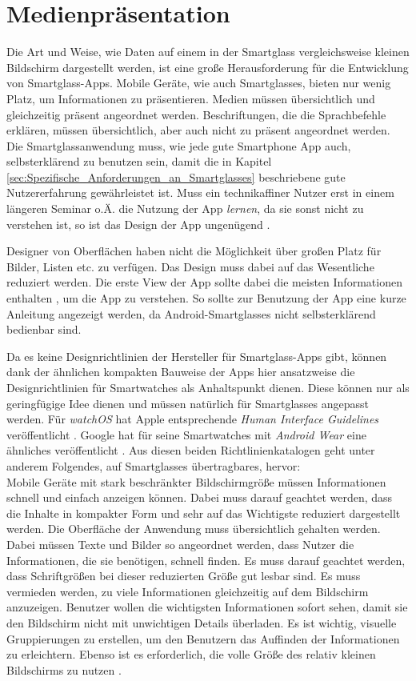 \section{Medienpräsentation}
\label{sec:Medienpraesentation}
Die Art und Weise, wie Daten auf einem in der Smartglass vergleichsweise kleinen Bildschirm dargestellt werden, ist eine große Herausforderung für die Entwicklung von Smartglass-Apps. Mobile Geräte, wie auch Smartglasses, bieten nur wenig Platz, um Informationen zu präsentieren. Medien müssen übersichtlich und gleichzeitig präsent angeordnet werden. Beschriftungen, die die Sprachbefehle erklären, müssen übersichtlich, aber auch nicht zu präsent angeordnet werden. Die Smartglassanwendung muss, wie jede gute Smartphone App auch, selbsterklärend zu benutzen sein, damit die in Kapitel \ref{sec:Spezifische_Anforderungen_an_Smartglasses} beschriebene gute Nutzererfahrung gewährleistet ist. 
Muss ein technikaffiner Nutzer erst in einem längeren Seminar o.Ä. die Nutzung der App \emph{lernen}, da sie sonst nicht zu verstehen ist, so ist das Design der App ungenügend \cite{Hoober2011} \cite[S.~141ff]{Norman2013}.

Designer von Oberflächen haben nicht die Möglichkeit über großen Platz für Bilder, Listen etc. zu verfügen. Das Design muss dabei auf das Wesentliche reduziert werden. Die erste View der App sollte dabei die meisten Informationen enthalten \cite[S.~442]{Tidwell2005}, um die App zu verstehen. So sollte zur Benutzung der App eine kurze Anleitung angezeigt werden, da Android-Smartglasses nicht selbsterklärend bedienbar sind.

Da es keine Designrichtlinien der Hersteller für Smartglass-Apps gibt, können dank der ähnlichen kompakten Bauweise der Apps hier ansatzweise die Designrichtlinien für Smartwatches als Anhaltspunkt dienen. Diese können nur als geringfügige Idee dienen und müssen natürlich für Smartglasses angepasst werden.
Für \emph{watchOS} hat Apple entsprechende \emph{Human Interface Guidelines} veröffentlicht \cite{Apple2018c}. Google hat für seine Smartwatches mit \emph{Android Wear} eine ähnliches veröffentlicht \cite{Google2018}. Aus diesen beiden Richtlinienkatalogen geht unter anderem Folgendes, auf Smartglasses übertragbares, hervor:
\\
Mobile Geräte mit stark beschränkter Bildschirmgröße  müssen Informationen schnell und einfach anzeigen können. Dabei muss darauf geachtet werden, dass die Inhalte in kompakter Form und sehr auf das Wichtigste reduziert dargestellt werden. Die Oberfläche der Anwendung muss übersichtlich gehalten werden. Dabei müssen Texte und Bilder so angeordnet werden, dass Nutzer die Informationen, die sie benötigen, schnell finden. Es muss darauf geachtet werden, dass Schriftgrößen bei dieser reduzierten Größe gut lesbar sind. Es muss vermieden werden, zu viele Informationen gleichzeitig auf dem Bildschirm anzuzeigen. Benutzer wollen die wichtigsten Informationen sofort sehen, damit sie den Bildschirm nicht mit unwichtigen Details überladen. Es ist wichtig, visuelle Gruppierungen zu erstellen, um den Benutzern das Auffinden der Informationen zu erleichtern. Ebenso ist es erforderlich, die volle Größe des relativ kleinen Bildschirms zu nutzen \cite{Apple2018c, Google2018}.

